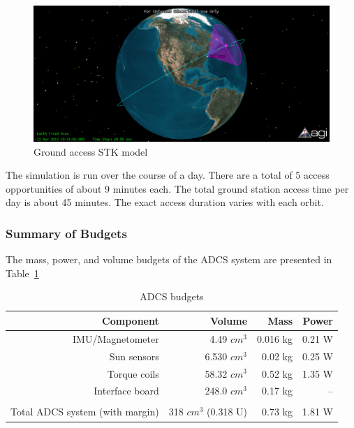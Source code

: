 \documentclass[12pt]{article}
\begin{document}
			\begin{figure}[!ht]
				\centering
				\includegraphics[scale=0.8]{images/ADCS_STK.png}
				\caption{Ground access STK model}
				\label{fig:ADCS_STK}
			\end{figure}
			
			The simulation is run over the course of a day. There are a total of 5 access opportunities of about 9 minutes each. The total ground station access time per day is about 45 minutes. The exact access duration varies with each orbit. 
		
			\subsubsection{Summary of Budgets}
			
			The mass, power, and volume budgets of the ADCS system are presented in Table~\ref{tab:ADCS_budget}
\begin{table}[htbp]
  \centering
  \caption{ADCS budgets}
    \begin{tabular}{|r|r|r|r|}
    \hline
    \textbf{Component} & \textbf{Volume} & \textbf{Mass} & \textbf{Power} \bigstrut\\
    \hline
    IMU/Magnetometer & 4.49 $cm^3$ & 0.016 kg & 0.21 W \bigstrut\\
    \hline
    Sun sensors & 6.530 $cm^3$ & 0.02 kg & 0.25 W \bigstrut\\
    \hline
    Torque coils & 58.32 $cm^3$ & 0.52 kg & 1.35 W \bigstrut\\
    \hline
    Interface board & 248.0 $cm^3$ & 0.17 kg & -- \bigstrut\\
    \hline
    \multicolumn{1}{r}{} & \multicolumn{1}{r}{} & \multicolumn{1}{r}{} & \multicolumn{1}{r}{} \bigstrut\\
    \hline
    Total ADCS system (with margin) & 318 $cm^3$ (0.318 U) & 0.73 kg & 1.81 W \bigstrut\\
    \hline
    \end{tabular}%
  \label{tab:ADCS_budget}%
\end{table}%
\end{document}
